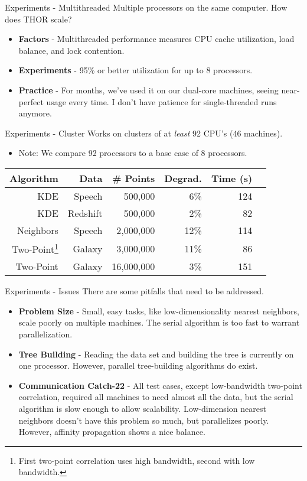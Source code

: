 \documentclass[pdf,colorBG,slideColor]{prosper}
\newcommand{\itemt}[1]{\item {\bf #1} -}
\begin{document}
\begin{slide}{Experiments - Multithreaded}
  Multiple processors on the same computer.
  How does THOR scale?
  \begin{itemize}
    \itemt{Factors}
    Multithreaded performance measures CPU cache utilization,
    load balance, and lock contention.
    \itemt{Experiments}
    95\% or better utilization for up to 8 processors.
    \itemt{Practice}
    For months, we've used it on our dual-core machines, seeing
    near-perfect usage every time.  I don't have patience for single-threaded
    runs anymore.
  \end{itemize}
\end{slide}

\begin{slide}{Experiments - Cluster}
  Works on clusters of at {\it least} 92 CPU's (46 machines).
  \begin{itemize}
    \item Note: We compare 92 processors to a base case of 8 processors.
  \end{itemize}
  \begin{tabular}{|r|r|r|r|r|r|}
    \hline
    {\bf Algorithm} & {\bf Data} & \# Points & Degrad. & Time (s)
    \\ \hline
    KDE & Speech & 500,000 & 6\% & 124
    \\ \hline
    KDE & Redshift & 500,000 & 2\% & 82
    \\ \hline
    Neighbors & Speech & 2,000,000 & 12\% & 114
    \\ \hline
    Two-Point\footnote{First two-point correlation uses high bandwidth, second with low bandwidth.} & Galaxy & 3,000,000 & 11\% & 86
    \\ \hline
    Two-Point & Galaxy & 16,000,000 & 3\% & 151
    \\ \hline
  \end{tabular}
\end{slide}

\begin{slide}{Experiments - Issues}
  There are some pitfalls that need to be addressed.
  \begin{itemize}
    \itemt{Problem Size}
    Small, easy tasks, like low-dimensionality nearest neighbors, scale poorly on multiple machines.
    The serial algorithm is too fast to warrant parallelization.
    \itemt{Tree Building}
    Reading the data set and building the tree is currently on one processor.
    However, parallel tree-building algorithms do exist.
    \itemt{Communication Catch-22}
    All test cases, except low-bandwidth two-point correlation, required
    all machines to need almost all the data, but the serial algorithm
    is slow enough to allow scalability.  Low-dimension nearest neighbors
    doesn't have this problem so much, but parallelizes poorly.
    However, affinity propagation shows a nice balance.
  \end{itemize}
\end{slide}
\end{document}
